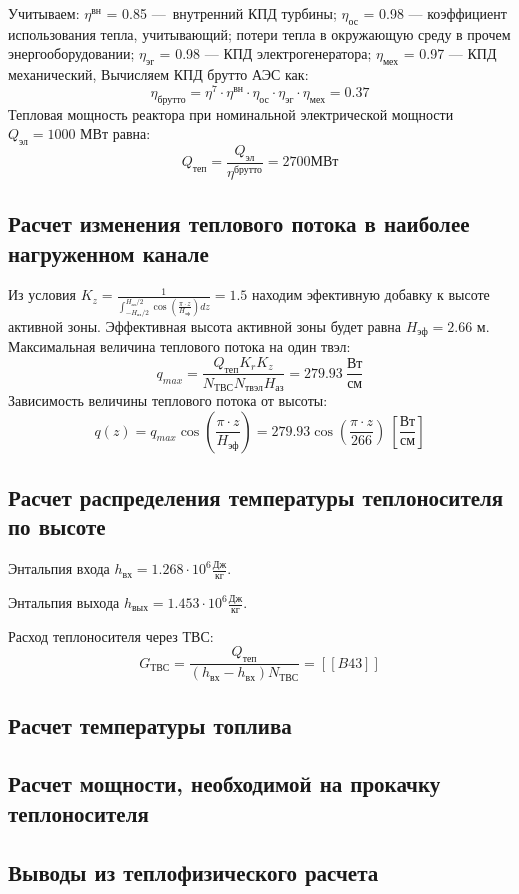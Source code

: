 Учитываем:
$\eta^{\text{вн}}$ = 0.85 — внутренний КПД турбины;
$\eta_{\text{ос}}$ = 0.98 — коэффициент использования тепла, учитывающий; потери тепла в окружающую среду в прочем энергооборудовании;
$\eta_{\text{эг}}$ = 0.98 — КПД электрогенератора;
$\eta_{\text{мех}}$ = 0.97 — КПД механический,
Вычисляем КПД брутто АЭС как:
$$
\eta_{\text{брутто}} = \eta^7 \cdot \eta^{\text{вн}} \cdot \eta_{\text{ос}} \cdot \eta_{\text{эг}} \cdot \eta_{\text{мех}} = 0.37
$$
Тепловая мощность реактора при номинальной электрической мощности $Q_{\text{эл}} = 1000$ МВт равна:
$$
Q_{\text{теп}} = \frac {Q_{\text{эл}}} {\eta^{\text{брутто}}} = 2700 МВт 
$$


\subsection{Расчет изменения теплового потока в наиболее нагруженном канале}
Из условия $K_z = \frac 1 {\int_{-H_{\text{аз}}/2}^{H_{\text{аз}}/2} \cos \left( \frac {\pi \cdot z} {H_{\text{эф}}}\right)dz} = 1.5$ находим эфективную добавку к высоте активной зоны. Эффективная высота активной зоны будет равна $H_{\text{эф}} = 2.66$ м. Максимальная величина теплового потока на один твэл:
$$
q_{max} = \frac {Q_{\text{теп}}K_r K_z}{N_{ТВС}N_{\text{твэл}}H_{\text{аз}}} = 279.93\  \frac {\text{Вт}} {\text{см}}
$$ 
Зависимость величины теплового потока от высоты:
$$
q(z) = q_{max}\cos\left(\frac {\pi\cdot z} {H_{\text{эф}}}\right) = 279.93 \cos \left(\frac {\pi \cdot z} {266} \right)\ \left[\frac{\text{Вт}}{\text{см}} \right]
$$

\subsection{Расчет распределения температуры теплоносителя по высоте}

Энтальпия входа $h_{\text{вх}} =1.268 \cdot 10^6 \frac{Дж}{кг}$.%

\noindent Энтальпия выхода $h_{\text{вых}} =1.453 \cdot 10^6 \frac{Дж}{кг}$. %

\noindent Расход теплоносителя через ТВС:
$$
G_{ТВС} = \frac {Q_{\text{теп}}} {(h_{\text{вх}} - h_{\text{вх}})N_{\text{ТВС}}} = [[B43]] 
$$

\subsection{Расчет температуры топлива}

\subsection{Расчет мощности, необходимой на прокачку теплоносителя}


\subsection{Выводы из теплофизического расчета}


